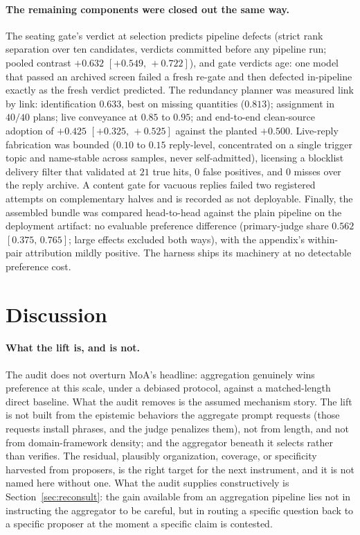 \documentclass[11pt]{article}
\newcommand{\ci}[2]{\ensuremath{[#1,\,#2]}}
\begin{document}
\paragraph{The remaining components were closed out the same way.} The
seating gate's verdict at selection predicts pipeline defects (strict
rank separation over ten candidates, verdicts committed before any
pipeline run; pooled contrast $+0.632$ \ci{+0.549}{+0.722}), and gate
verdicts age: one model that passed an archived screen failed a fresh
re-gate and then defected in-pipeline exactly as the fresh verdict
predicted. The redundancy planner was measured link by link:
identification $0.633$, best on missing quantities ($0.813$);
assignment in $40/40$ plans; live conveyance at $0.85$ to $0.95$; and
end-to-end clean-source adoption of $+0.425$ \ci{+0.325}{+0.525}
against the planted $+0.500$. Live-reply fabrication was bounded
($0.10$ to $0.15$ reply-level, concentrated on a single trigger topic
and name-stable across samples, never self-admitted), licensing a
blocklist delivery filter that validated at $21$ true hits, $0$ false
positives, and $0$ misses over the reply archive. A content gate for
vacuous replies failed two registered attempts on complementary halves
and is recorded as not deployable. Finally, the assembled bundle was
compared head-to-head against the plain pipeline on the deployment
artifact: no evaluable preference difference (primary-judge share
$0.562$ \ci{0.375}{0.765}; large effects excluded both ways), with the
appendix's within-pair attribution mildly positive. The harness ships
its machinery at no detectable preference cost.

\section{Discussion}
\label{sec:discussion}

\paragraph{What the lift is, and is not.} The audit does not overturn
MoA's headline: aggregation genuinely wins preference at this scale,
under a debiased protocol, against a matched-length direct baseline.
What the audit removes is the assumed mechanism story. The lift is not
built from the epistemic behaviors the aggregate prompt requests (those
requests install phrases, and the judge penalizes them), not from
length, and not from domain-framework density; and the aggregator
beneath it selects rather than verifies. The residual, plausibly
organization, coverage, or specificity harvested from proposers, is the
right target for the next instrument, and it is not named here without
one. What the audit supplies constructively is
Section~\ref{sec:reconsult}: the gain available from an aggregation
pipeline lies not in instructing the aggregator to be careful, but in
routing a specific question back to a specific proposer at the moment a
specific claim is contested.
\end{document}
